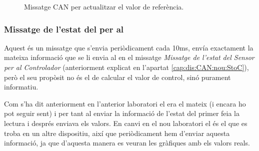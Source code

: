 \begin{figure}[ht!]
	
    \caption{Missatge CAN per actualitzar el valor de referència.}
    \label{fig:bit_encoding:CAN:nou:referencia}
\end{figure}


\subsubsection{Missatge de l'estat del \Sensor per al \Supervisor}\label{cap:dis:CAN:nou:SetoSu}

Aquest és un missatge que s'envia periòdicament cada 10ms, envía exactament la mateixa informació que se li envia al \Controlador en el missatge \emph{Missatge de l'estat del Sensor per al Controlador} (anteriorment explicat en l'apartat \ref{cap:dis:CAN:nou:StoC}), però el seu propòsit no és el de calcular el valor de control, sinó purament informatiu. 

Com s'ha dit anteriorment en l'anterior laboratori el \Supervisor era el mateix \SensorActuador (i encara ho pot seguir sent) i per tant al enviar la informació de l'estat del \Sensor primer feia la lectura i després enviava els valors. En canvi en el nou laboratori el \Supervisor és el \Monitor que es troba en un altre dispositiu, així que periòdicament hem d'enviar aquesta informació, ja que d'aquesta manera es veuran les gràfiques amb els valors reals.

